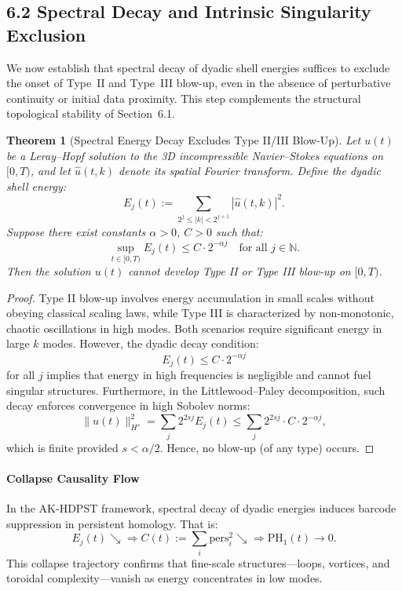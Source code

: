 \documentclass[11pt]{article}
\newtheorem{theorem}{Theorem}[section]
\theoremstyle{definition}
\begin{document}
\subsection{6.2 Spectral Decay and Intrinsic Singularity Exclusion}

We now establish that spectral decay of dyadic shell energies suffices to exclude the onset of Type~II and Type~III blow-up, even in the absence of perturbative continuity or initial data proximity. This step complements the structural topological stability of Section~6.1.

\begin{theorem}[Spectral Energy Decay Excludes Type II/III Blow-Up]
Let \( u(t) \) be a Leray--Hopf solution to the 3D incompressible Navier--Stokes equations on \( [0,T) \), and let \( \hat{u}(t,k) \) denote its spatial Fourier transform. Define the dyadic shell energy:
\[
E_j(t) := \sum_{2^j \le |k| < 2^{j+1}} |\hat{u}(t,k)|^2.
\]
Suppose there exist constants \( \alpha > 0 \), \( C > 0 \) such that:
\[
\sup_{t \in [0,T)} E_j(t) \le C \cdot 2^{-\alpha j} \quad \text{for all } j \in \mathbb{N}.
\]
Then the solution \( u(t) \) cannot develop Type II or Type III blow-up on \( [0,T) \).
\end{theorem}

\begin{proof}
Type II blow-up involves energy accumulation in small scales without obeying classical scaling laws, while Type III is characterized by non-monotonic, chaotic oscillations in high modes. Both scenarios require significant energy in large $k$ modes. However, the dyadic decay condition:
\[
E_j(t) \le C \cdot 2^{-\alpha j}
\]
for all $j$ implies that energy in high frequencies is negligible and cannot fuel singular structures. Furthermore, in the Littlewood–Paley decomposition, such decay enforces convergence in high Sobolev norms:
\[
\| u(t) \|_{H^s}^2 = \sum_j 2^{2sj} E_j(t) \le \sum_j 2^{2sj} \cdot C \cdot 2^{-\alpha j},
\]
which is finite provided $s < \alpha/2$. Hence, no blow-up (of any type) occurs.
\end{proof}

\paragraph{Collapse Causality Flow}

In the AK-HDPST framework, spectral decay of dyadic energies induces barcode suppression in persistent homology. That is:
\[
E_j(t) \searrow \Rightarrow C(t) := \sum_i \text{pers}_i^2 \searrow \Rightarrow \mathrm{PH}_1(t) \to 0.
\]
This collapse trajectory confirms that fine-scale structures—loops, vortices, and toroidal complexity—vanish as energy concentrates in low modes.
\end{document}
